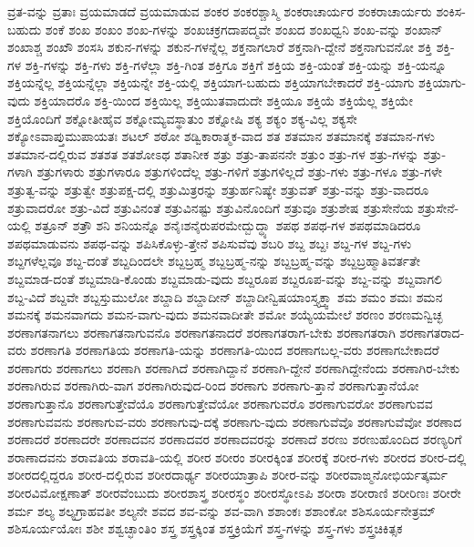 {ವ್ರತ-ವನ್ನು
ವ್ರತಾಃ
ವ್ರಯಮಾಡದೆ
ವ್ರಯಮಾಡುವ
ಶಂಕರ
ಶಂಕರಶ್ಚಾಸ್ಮಿ
ಶಂಕರಾಚಾರ್ಯರ
ಶಂಕರಾಚಾರ್ಯರು
ಶಂಕಿಸ-ಬಹುದು
ಶಂಕೆ
ಶಂಖ
ಶಂಖಂ
ಶಂಖ-ಗಳನ್ನು
ಶಂಖಚಕ್ರಗದಾಪದ್ಮವೇ
ಶಂಖದ
ಶಂಖಧ್ವನಿ
ಶಂಖ-ವನ್ನು
ಶಂಖಾನ್
ಶಂಖಾಶ್ಚ
ಶಂಖೌ
ಶಂಸಸಿ
ಶಕುನ-ಗಳನ್ನು
ಶಕುನ-ಗಳನ್ನೆಲ್ಲ
ಶಕ್ತನಾಗಲಾರೆ
ಶಕ್ತನಾಗಿ-ದ್ದೇನೆ
ಶಕ್ತನಾಗುವನೋ
ಶಕ್ತಿ
ಶಕ್ತಿ-ಗಳ
ಶಕ್ತಿ-ಗಳನ್ನು
ಶಕ್ತಿ-ಗಳು
ಶಕ್ತಿ-ಗಳೆಲ್ಲಾ
ಶಕ್ತಿ-ಗಿಂತ
ಶಕ್ತಿಗೂ
ಶಕ್ತಿಗೆ
ಶಕ್ತಿಯ
ಶಕ್ತಿ-ಯಂತೆ
ಶಕ್ತಿ-ಯನ್ನು
ಶಕ್ತಿ-ಯನ್ನೂ
ಶಕ್ತಿಯನ್ನೆಲ್ಲ
ಶಕ್ತಿಯನ್ನೆಲ್ಲಾ
ಶಕ್ತಿಯನ್ನೇ
ಶಕ್ತಿ-ಯಲ್ಲಿ
ಶಕ್ತಿಯಾಗ-ಬಹುದು
ಶಕ್ತಿಯಾಗಬೇಕಾದರೆ
ಶಕ್ತಿ-ಯಾಗು
ಶಕ್ತಿಯಾಗು-ವುದು
ಶಕ್ತಿಯಾದರೊ
ಶಕ್ತಿ-ಯಿಂದ
ಶಕ್ತಿಯಿಲ್ಲ
ಶಕ್ತಿಯುತವಾದುದೇ
ಶಕ್ತಿಯೂ
ಶಕ್ತಿಯೆ
ಶಕ್ತಿಯೆಲ್ಲ
ಶಕ್ತಿಯೇ
ಶಕ್ತಿಯೊಂದಿಗೆ
ಶಕ್ನೋತೀಹೈವ
ಶಕ್ನೋಮ್ಯವಸ್ಥಾತುಂ
ಶಕ್ನೋಷಿ
ಶಕ್ಯ
ಶಕ್ಯಂ
ಶಕ್ಯ-ವಿಲ್ಲ
ಶಕ್ಯಸೇ
ಶಕ್ಯೋಽವಾಪ್ತುಮುಪಾಯತಃ
ಶಟಲ್
ಶಠೋ
ಶಡ್ವಿಕಾರಾತ್ಮಕ-ವಾದ
ಶತ
ಶತಮಾನ
ಶತಮಾನಕ್ಕೆ
ಶತಮಾನ-ಗಳು
ಶತಮಾನ-ದಲ್ಲಿರುವ
ಶತಶತ
ಶತಶೋಽಥ
ಶತಾನೀಕ
ಶತ್ರು
ಶತ್ರು-ತಾಪನನೇ
ಶತ್ರುಂ
ಶತ್ರು-ಗಳ
ಶತ್ರು-ಗಳನ್ನು
ಶತ್ರು-ಗಳಾಗಿ
ಶತ್ರುಗಳಾರು
ಶತ್ರುಗಳಾರೂ
ಶತ್ರುಗಳಿಂದೆಲ್ಲ
ಶತ್ರು-ಗಳಿಗೆ
ಶತ್ರುಗಳಿಲ್ಲದೆ
ಶತ್ರು-ಗಳು
ಶತ್ರು-ಗಳೂ
ಶತ್ರು-ಗಳೇ
ಶತ್ರುತ್ವ-ವನ್ನು
ಶತ್ರುತ್ವೇ
ಶತ್ರುಪಕ್ಷ-ದಲ್ಲಿ
ಶತ್ರುಮಿತ್ರರನ್ನು
ಶತ್ರುರ್ಹನಿಷ್ಯೇ
ಶತ್ರುವತ್
ಶತ್ರು-ವನ್ನು
ಶತ್ರು-ವಾದರೂ
ಶತ್ರುವಾದರೋ
ಶತ್ರು-ವಿದೆ
ಶತ್ರುವಿನಂತೆ
ಶತ್ರುವಿನಷ್ಟು
ಶತ್ರುವಿನೊಂದಿಗೆ
ಶತ್ರುವೂ
ಶತ್ರುಶೇಷ
ಶತ್ರುಸೇನೆಯ
ಶತ್ರುಸೇನೆ-ಯಲ್ಲಿ
ಶತ್ರೂನ್
ಶತ್ರೌ
ಶನಿ
ಶನಿಯನ್ನೊ
ಶನೈಃಶನೈರುಪರಮೇದ್ಬುದ್ಧ್ಯಾ
ಶಪಥ
ಶಪಥ-ಗಳ
ಶಪಥಮಾಡಿದರೂ
ಶಪಥಮಾಡುವನು
ಶಪಥ-ವನ್ನು
ಶಪಿಸಿಕೊಳ್ಳು-ತ್ತೇನೆ
ಶಪಿಸುವೆವು
ಶಬರಿ
ಶಬ್ದ
ಶಬ್ದಃ
ಶಬ್ದ-ಗಳ
ಶಬ್ದ-ಗಳು
ಶಬ್ದಗಳೆಲ್ಲವೂ
ಶಬ್ದ-ದಂತೆ
ಶಬ್ದದಿಂದಲೇ
ಶಬ್ದಬ್ರಹ್ಮ
ಶಬ್ದಬ್ರಹ್ಮ-ನನ್ನು
ಶಬ್ದಬ್ರಹ್ಮ-ವನ್ನು
ಶಬ್ದಬ್ರಹ್ಮಾತಿವರ್ತತೇ
ಶಬ್ದಮಾಡ-ದಂತೆ
ಶಬ್ದಮಾಡಿ-ಕೊಂಡು
ಶಬ್ದಮಾಡು-ವುದು
ಶಬ್ದರೂಪ
ಶಬ್ದರೂಪ-ವನ್ನು
ಶಬ್ದ-ವನ್ನು
ಶಬ್ದವಾಗಲಿ
ಶಬ್ದ-ವಿದೆ
ಶಬ್ದವೇ
ಶಬ್ದಸ್ತುಮುಲೋ
ಶಬ್ದಾದಿ
ಶಬ್ದಾದೀನ್
ಶಬ್ದಾದೀನ್ವಿಷಯಾಂಸ್ತ್ಯಕ್ತ್ವಾ
ಶಮ
ಶಮಂ
ಶಮಃ
ಶಮನ
ಶಮನಕ್ಕೆ
ಶಮನವಾಗದು
ಶಮನ-ವಾಗು-ವುದು
ಶಮನವಾದೀತೇ
ಶಮೋ
ಶಯ್ಯೆಯಮೇಲೆ
ಶರಣಂ
ಶರಣಮನ್ವಿಚ್ಛ
ಶರಣಾಗತನಾಗಲು
ಶರಣಾಗತನಾಗುವನೊ
ಶರಣಾಗತನಾದರೆ
ಶರಣಾಗತರಾಗ-ಬೇಕು
ಶರಣಾಗತರಾಗಿ
ಶರಣಾಗತರಾದ-ವರು
ಶರಣಾಗತಿ
ಶರಣಾಗತಿಯ
ಶರಣಾಗತಿ-ಯನ್ನು
ಶರಣಾಗತಿ-ಯಿಂದ
ಶರಣಾಗಬಲ್ಲ-ವರು
ಶರಣಾಗಬೇಕಾದರೆ
ಶರಣಾಗರು
ಶರಣಾಗಲು
ಶರಣಾಗಿ
ಶರಣಾಗಿದೆ
ಶರಣಾಗಿದ್ದಾನೆ
ಶರಣಾಗಿ-ದ್ದೇನೆ
ಶರಣಾಗಿದ್ದೇನೆಂದು
ಶರಣಾಗಿರ-ಬೇಕು
ಶರಣಾಗಿರುವ
ಶರಣಾಗಿರು-ವಾಗ
ಶರಣಾಗಿರುವುದ-ರಿಂದ
ಶರಣಾಗು
ಶರಣಾಗು-ತ್ತಾನೆ
ಶರಣಾಗುತ್ತಾನೆಯೋ
ಶರಣಾಗುತ್ತಾನೊ
ಶರಣಾಗುತ್ತೇವೆಯೊ
ಶರಣಾಗುತ್ತೇವೆಯೋ
ಶರಣಾಗುವರೊ
ಶರಣಾಗುವರೋ
ಶರಣಾಗುವವ
ಶರಣಾಗುವವನು
ಶರಣಾಗುವ-ವರು
ಶರಣಾಗುವು-ದಕ್ಕೆ
ಶರಣಾಗು-ವುದು
ಶರಣಾಗುವೆವೊ
ಶರಣಾಗುವೆವೋ
ಶರಣಾದ
ಶರಣಾದರೆ
ಶರಣಾದರೇ
ಶರಣಾದವನ
ಶರಣಾದವರ
ಶರಣಾದವರನ್ನು
ಶರಣಾದೆ
ಶರಣು
ಶರಣುಹೊಂದಿದ
ಶರಣ್ಯರಿಗೆ
ಶರಾಣಾದವನು
ಶರಾವತಿಯ
ಶರಾವತಿ-ಯಲ್ಲಿ
ಶರೀರ
ಶರೀರಂ
ಶರೀರಕ್ಕಿಂತ
ಶರೀರಕ್ಕೆ
ಶರೀರ-ಗಳು
ಶರೀರದ
ಶರೀರ-ದಲ್ಲಿ
ಶರೀರದಲ್ಲಿದ್ದರೂ
ಶರೀರ-ದಲ್ಲಿರುವ
ಶರೀರದಾರ್ಢ್ಯ
ಶರೀರಯಾತ್ರಾಪಿ
ಶರೀರ-ವನ್ನು
ಶರೀರವಾಙ್ಮನೋಭಿರ್ಯತ್ಕರ್ಮ
ಶರೀರವಿಮೋಕ್ಷಣಾತ್
ಶರೀರವೆಂಬುದು
ಶರೀರಶಾಸ್ತ್ರ
ಶರೀರಸ್ಥಂ
ಶರೀರಸ್ಥೋಽಪಿ
ಶರೀರಾ
ಶರೀರಾಣಿ
ಶರೀರಿಣಃ
ಶರೀರೇ
ಶರ್ಮ
ಶಲ್ಯ
ಶಲ್ಯಗ್ರಾಹವತೀ
ಶಲ್ಯನೇ
ಶವದ
ಶವ-ವನ್ನು
ಶವ-ವಾಗಿ
ಶಶಾಂಕಃ
ಶಶಾಂಕೋ
ಶಶಿಸೂರ್ಯನೇತ್ರಮ್
ಶಶಿಸೂರ್ಯಯೋಃ
ಶಶೀ
ಶಶ್ವಚ್ಛಾಂತಿಂ
ಶಸ್ತ್ರ
ಶಸ್ತ್ರಕ್ಕಿಂತ
ಶಸ್ತ್ರಕ್ರಿಯೆಗೆ
ಶಸ್ತ್ರ-ಗಳನ್ನು
ಶಸ್ತ್ರ-ಗಳು
ಶಸ್ತ್ರಚಿಕಿತ್ಸಕ
}
